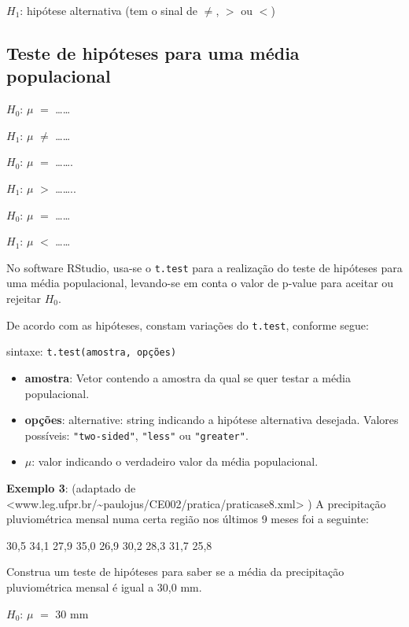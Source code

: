\documentclass[12pt,brazil,oneside]{book}
\providecommand{\tightlist}{%
  \setlength{\itemsep}{0pt}\setlength{\parskip}{0pt}}
\begin{document}
\textbf{\(H_1\)}: hipótese alternativa (tem o sinal de \(\neq\), \(>\) ou \(<\))

\hypertarget{teste-de-hipoteses-para-uma-media-populacional}{%
\subsection{Teste de hipóteses para uma média populacional}\label{teste-de-hipoteses-para-uma-media-populacional}}

\(H_0\): \(\mu\) \(=\) \ldots{}\ldots{}

\(H_1\): \(\mu\) \(\neq\) \ldots{}\ldots{}

\(H_0\): \(\mu\) \(=\) \ldots{}\ldots{}.

\(H_1\): \(\mu\) \(>\) \ldots{}\ldots{}..

\(H_0\): \(\mu\) \(=\) \ldots{}\ldots{}

\(H_1\): \(\mu\) \(<\) \ldots{}\ldots{}

No software RStudio, usa-se o \texttt{t.test} para a realização do teste de hipóteses para uma média populacional, levando-se em conta o valor de p-value para aceitar ou rejeitar \(H_0\).

De acordo com as hipóteses, constam variações do \texttt{t.test}, conforme segue:

sintaxe: \texttt{t.test(amostra,\ opções)}

\begin{itemize}
\tightlist
\item
  \textbf{amostra}: Vetor contendo a amostra da qual se quer testar a média populacional.
\item
  \textbf{opções}: alternative: string indicando a hipótese alternativa desejada. Valores possíveis: \texttt{"two-sided"}, \texttt{"less"} ou \texttt{"greater"}.
\item
  \(\mu\): valor indicando o verdadeiro valor da média populacional.
\end{itemize}

\textbf{Exemplo 3}: (adaptado de \textless{}www.leg.ufpr.br/\textasciitilde{}paulojus/CE002/pratica/praticase8.xml\textgreater{} ) A precipitação pluviométrica mensal numa certa região nos últimos 9 meses foi a seguinte:

30,5 34,1 27,9 35,0 26,9 30,2 28,3 31,7 25,8

Construa um teste de hipóteses para saber se a média da precipitação pluviométrica mensal é igual a 30,0 mm.

\textbf{\(H_0\)}: \(\mu\) \(=\) 30 mm
\end{document}
